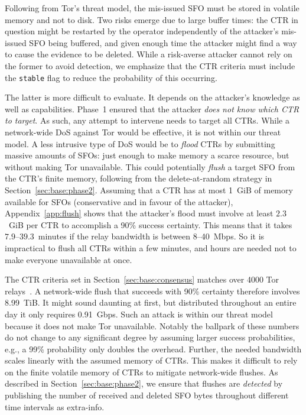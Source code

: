 Following from Tor's threat model, the mis-issued SFO must be stored in volatile
memory and not to disk.  Two risks emerge due to large buffer times:
	the CTR in question might be restarted by the operator independently of the
		attacker's mis-issued SFO being buffered,
	and given enough time the attacker might find a way to cause the evidence to
		be deleted.
While a risk-averse attacker cannot rely on the former to avoid detection, we
emphasize that the CTR criteria must include the \texttt{stable} flag to reduce
the probability of this occurring.

The latter is more difficult to evaluate.  It depends on the attacker's
knowledge as well as capabilities.  Phase~1 ensured that the attacker \emph{does
not know which CTR to target}.  As such, any attempt to intervene needs to
target all CTRs.  While a network-wide DoS against Tor would be effective, it is
not within our threat model.  A less intrusive type of DoS would be to
\emph{flood} CTRs by submitting massive amounts of SFOs: just enough to make
memory a scarce resource, but without making Tor unavailable. This could
potentially \emph{flush} a target SFO from the CTR's finite memory, following
from the delete-at-random strategy in Section~\ref{sec:base:phase2}. Assuming
that a CTR has at most 1~GiB of memory available for SFOs (conservative and in
favour of the attacker), Appendix~\ref{app:flush} shows that the attacker's
flood must involve at least $2.3$~GiB per CTR to accomplish a 90\% success
certainty.  This means that it takes $7.9$--$39.3$~minutes if the relay
bandwidth is between 8--40~Mbps.  So it is impractical to flush all CTRs within
a few minutes, and hours are needed not to make everyone unavailable at once.

The CTR criteria set in Section~\ref{sec:base:consensus} matches over
4000 Tor relays~\cite{relay-by-flag}.  A network-wide flush that succeeds with
90\% certainty therefore involves 8.99~TiB.  It might sound daunting at first,
but distributed throughout an entire day it only requires 0.91~Gbps. Such an
attack is within our threat model because it does not make Tor unavailable.
Notably the ballpark of these numbers do not change to any significant degree by
assuming larger success probabilities, e.g., a 99\% probability only doubles the
overhead. Further, the needed bandwidth scales linearly with the assumed memory
of CTRs.  This makes it difficult to rely on the finite volatile memory of CTRs
to mitigate network-wide flushes.  As described in
Section~\ref{sec:base:phase2}, we ensure that flushes are \emph{detected} by
publishing the number of received and deleted SFO bytes throughout different
time intervals as extra-info.

